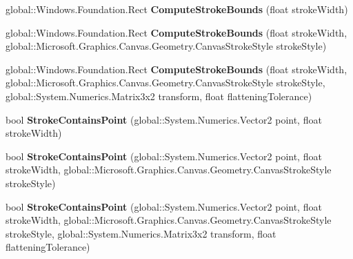 \begin{DoxyCompactItemize}
\mbox{\label{class_microsoft_1_1_graphics_1_1_canvas_1_1_geometry_1_1_canvas_geometry_ae0b4d41a78ebb80d02c862619a7d69cd}} 
global\+::\+Windows.\+Foundation.\+Rect {\bfseries Compute\+Stroke\+Bounds} (float stroke\+Width)
\item 
\mbox{\label{class_microsoft_1_1_graphics_1_1_canvas_1_1_geometry_1_1_canvas_geometry_a1944cea013afac73147a5ab67b3adf46}} 
global\+::\+Windows.\+Foundation.\+Rect {\bfseries Compute\+Stroke\+Bounds} (float stroke\+Width, global\+::\+Microsoft.\+Graphics.\+Canvas.\+Geometry.\+Canvas\+Stroke\+Style stroke\+Style)
\item 
\mbox{\label{class_microsoft_1_1_graphics_1_1_canvas_1_1_geometry_1_1_canvas_geometry_a2587e2485f5e40dce3e189b1e840c170}} 
global\+::\+Windows.\+Foundation.\+Rect {\bfseries Compute\+Stroke\+Bounds} (float stroke\+Width, global\+::\+Microsoft.\+Graphics.\+Canvas.\+Geometry.\+Canvas\+Stroke\+Style stroke\+Style, global\+::\+System.\+Numerics.\+Matrix3x2 transform, float flattening\+Tolerance)
\item 
\mbox{\label{class_microsoft_1_1_graphics_1_1_canvas_1_1_geometry_1_1_canvas_geometry_a487c9868385c05d9028ba59b0663e9f3}} 
bool {\bfseries Stroke\+Contains\+Point} (global\+::\+System.\+Numerics.\+Vector2 point, float stroke\+Width)
\item 
\mbox{\label{class_microsoft_1_1_graphics_1_1_canvas_1_1_geometry_1_1_canvas_geometry_add386d8e31ab0caf7b1b42d94e038fcd}} 
bool {\bfseries Stroke\+Contains\+Point} (global\+::\+System.\+Numerics.\+Vector2 point, float stroke\+Width, global\+::\+Microsoft.\+Graphics.\+Canvas.\+Geometry.\+Canvas\+Stroke\+Style stroke\+Style)
\item 
\mbox{\label{class_microsoft_1_1_graphics_1_1_canvas_1_1_geometry_1_1_canvas_geometry_a41adeb9ece02222f6a21e9635da34d5b}} 
bool {\bfseries Stroke\+Contains\+Point} (global\+::\+System.\+Numerics.\+Vector2 point, float stroke\+Width, global\+::\+Microsoft.\+Graphics.\+Canvas.\+Geometry.\+Canvas\+Stroke\+Style stroke\+Style, global\+::\+System.\+Numerics.\+Matrix3x2 transform, float flattening\+Tolerance)

\end{DoxyCompactItemize}
